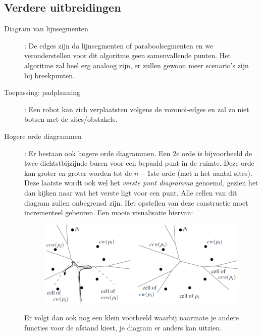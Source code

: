 \documentclass[12pt,a4paper]{article}
\begin{document}
	
	\subsection{Verdere uitbreidingen}
	\begin{description}
		\item[Diagram van lijnsegmenten]: De edges zijn da lijnsegmenten of paraboolsegmenten en we veronderstellen voor dit algoritme geen samenvallende punten. Het algoritme zal heel erg analoog zijn, er zullen gewoon meer scenario's zijn bij breekpunten. 
		\item[Toepassing: padplanning]: Een robot kan zich verplaatsten volgens de voronoi-edges en zal zo niet botsen met de sites/obstakels. 
		\item[Hogere orde diagrammen]: Er bestaan ook hogere orde diagrammen. Een 2e orde is bijvoorbeeld de twee dichtstbijzijnde buren voor een bepaald punt in de ruimte. Deze orde kan groter en groter worden tot de $n-1$ste orde (met n het aantal sites). Deze laatste wordt ook wel het \textit{verste punt diagramma} genoemd, gezien het dan kijken naar wat het verste ligt voor een punt. Alle cellen van dit diagram zullen onbegrensd zijn. Het opstellen van deze constructie moet incrementeel gebeuren. Een mooie visualisatie hiervan:
		\begin{figure}[H]
			\centering
			\includegraphics[width=0.9\linewidth]{afbeeldingen/voronoi/hogere-orde}
			\label{fig:hogere-orde}
		\end{figure}
		
		Er volgt dan ook nog een klein voorbeeld waarbij naarmate je andere functies voor de afstand kiest, je diagram er anders kan uitzien.
	\end{description} 
	
	
\end{document}
